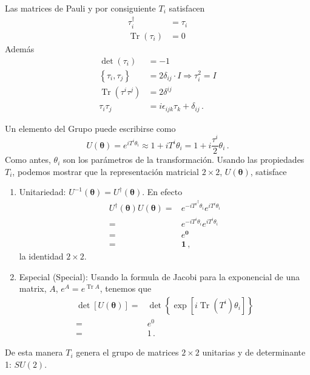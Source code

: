 Las matrices de Pauli y por consiguiente $T_i$ satisfacen 
\begin{align}
  \tau_i^\dagger&=\tau_i\nonumber\\
  \operatorname{Tr}  \left(
    \tau_i
  \right)&=0
\end{align}
Además
\begin{align}
  \label{eq:64qft}
  \det
  \left(
    \tau_i
  \right)&=-1\nonumber\\
  \left\{ 
    \tau_i,\tau_j
  \right\}&=2\delta_{ij}\cdot I\Rightarrow\tau_i^2=I\nonumber \\
\operatorname{Tr} \left(\tau^i\tau^j\right)&=2\delta^{ij}\nonumber\\
\tau_i\tau_j&=i\epsilon_{ijk}\tau_k+\delta_{ij}\,.
\end{align}

Un elemento del Grupo puede escribirse como
\begin{equation}
  \label{eq:63qft}
  U(\boldsymbol{\theta})=e^{iT^i \theta_i }\approx1+iT^i\theta_i=1+i\frac{\tau^i}{2}\theta_i\,.
\end{equation}
Como antes, $\theta_i$ son los parámetros de la transformación.  Usando las propiedades $T_i$, podemos mostrar que la representación matricial $2\times 2$, $U(\boldsymbol{\theta})$, satisface
\begin{enumerate}
\item Unitariedad: $U^{-1}(\boldsymbol{\theta})=U^{\dagger}(\boldsymbol{\theta})$. En efecto
  \begin{align*}
    U^{\dagger}(\boldsymbol{\theta})U(\boldsymbol{\theta})=&e^{-i{T^i}^{\dagger} \theta_i }e^{iT^i \theta_i }\nonumber\\
=&e^{-i T^i \theta_i }e^{iT^i \theta_i } \nonumber\\
=&e^{\mathbf{0}}\nonumber\\
=&\mathbf{1}\,,
  \end{align*}
la identidad $2\times 2$.
\item Especial (Special): Usando la formula de Jacobi para la exponencial de una matrix, $A$, $e^{A}=e^{\operatorname{Tr}A}$, tenemos que
  \begin{align*}
   \det[U(\boldsymbol{\theta})]=&\det\left\{\exp\left[  i \operatorname{Tr}\left( T^i \right)\theta_i \right]  \right\}\nonumber\\
                           =&e^{0}\nonumber\\
                           =&1\,.
  \end{align*}
\end{enumerate}
De esta manera $T_i$ genera el grupo de matrices $2\times 2$ unitarias y de determinante 1: $SU(2)$. 

